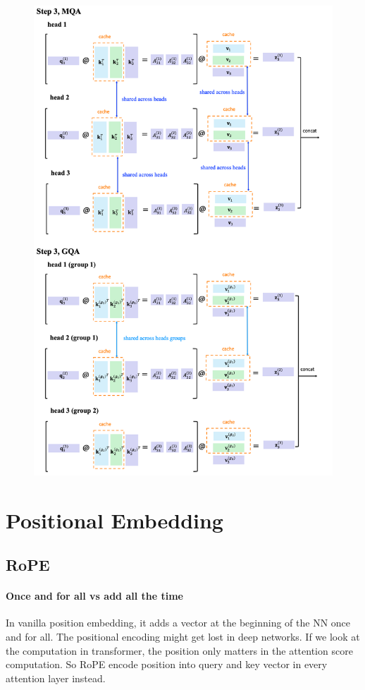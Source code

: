 \documentclass{article}
\begin{document}
\begin{figure}[!h]
	\centering
	\includegraphics[scale=0.45]{imgs/GQA.png}
\end{figure}


\clearpage

\section{Positional Embedding}

\subsection{RoPE}


\paragraph{Once and for all vs add all the time}
In vanilla position embedding, it adds a vector at the beginning of the NN once and for all.
The positional encoding might get lost in deep networks.
If we look at the computation in transformer, the position only matters in the attention score computation.
So RoPE encode position into query and key vector in every attention layer instead.
\end{document}
